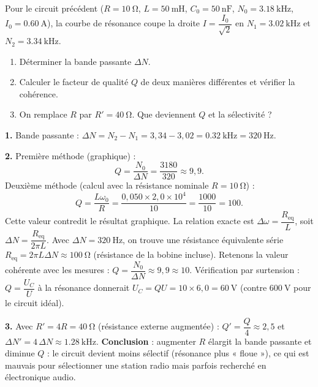 \documentclass[11pt]{article}
\begin{document}
\begin{exoresolu}
Pour le circuit précédent ($R = \SI{10}{\ohm}$, $L = \SI{50}{\milli\henry}$, $C_0 = \SI{50}{\nano\farad}$, $N_0 = \SI{3,18}{\kilo\hertz}$, $I_0 = \SI{0,60}{\ampere}$), la courbe de résonance coupe la droite $I = \dfrac{I_0}{\sqrt{2}}$ en $N_1 = \SI{3,02}{\kilo\hertz}$ et $N_2 = \SI{3,34}{\kilo\hertz}$.
\begin{enumerate}
\item Déterminer la bande passante $\Delta N$.
\item Calculer le facteur de qualité $Q$ de deux manières différentes et vérifier la cohérence.
\item On remplace $R$ par $R' = \SI{40}{\ohm}$. Que deviennent $Q$ et la sélectivité ?
\end{enumerate}
\tcblower
\textbf{1.} Bande passante : $\Delta N = N_2 - N_1 = 3{,}34 - 3{,}02 = \SI{0,32}{\kilo\hertz} = \SI{320}{\hertz}$.

\textbf{2.} Première méthode (graphique) :
\[ Q = \dfrac{N_0}{\Delta N} = \dfrac{3180}{320} \approx 9{,}9. \]
Deuxième méthode (calcul avec la résistance nominale $R = \SI{10}{\ohm}$) :
\[ Q = \dfrac{L\omega_0}{R} = \dfrac{0{,}050 \times 2{,}0\times 10^{4}}{10} = \dfrac{1000}{10} = 100. \]
Cette valeur contredit le résultat graphique. La relation exacte est $\Delta\omega = \dfrac{R_{\text{eq}}}{L}$, soit $\Delta N = \dfrac{R_{\text{eq}}}{2\pi L}$. Avec $\Delta N = \SI{320}{\hertz}$, on trouve une résistance équivalente série $R_{\text{eq}} = 2\pi L \Delta N \approx \SI{100}{\ohm}$ (résistance de la bobine incluse). Retenons la valeur cohérente avec les mesures : $Q = \dfrac{N_0}{\Delta N} \approx 9{,}9 \approx 10$.
Vérification par surtension : $Q = \dfrac{U_C}{U}$ à la résonance donnerait $U_C = QU = 10 \times 6{,}0 = \SI{60}{\volt}$ (contre $\SI{600}{\volt}$ pour le circuit idéal).

\textbf{3.} Avec $R' = 4R = \SI{40}{\ohm}$ (résistance externe augmentée) : $Q' = \dfrac{Q}{4} \approx 2{,}5$ et $\Delta N' = 4\,\Delta N \approx \SI{1,28}{\kilo\hertz}$.
\textbf{Conclusion} : augmenter $R$ élargit la bande passante et diminue $Q$ : le circuit devient moins sélectif (résonance plus « floue »), ce qui est mauvais pour sélectionner une station radio mais parfois recherché en électronique audio.
\end{exoresolu}
\end{document}
